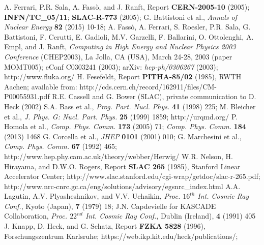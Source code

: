               A. Ferrari, P.R. Sala, A. Fass\`o, and J. Ranft,
              Report {\bf CERN-2005-10} (2005); {\bf INFN/TC\_05/11}; 
              {\bf SLAC-R-773} (2005);
              G. Battistoni et al., 
              {\it Annals of Nuclear Energy} {\bf 82} (2015) 10-18;
              A. Fass\`o, A. Ferrari, S. Roesler, P.R. Sala,
              G. Battistoni, F. Cerutti, E. Gadioli, M.V. Garzelli, 
              F. Ballarini, O. Ottolenghi, A. Empl, and J. Ranft,
              {\it Computing in High Energy and Nuclear Physics 2003 
              Conference} (CHEP2003), La Jolla, CA (USA), March 24-28, 2003
              (paper MOMT005); eConf C0303241 (2003); 
              arXiv: {\it hep-ph/0306267} (2003);
              http://www.fluka.org/
 H. Fesefeldt, Report {\bf PITHA-85/02} (1985), 
              RWTH Aachen; available from: 
              http://cds.cern.ch/record/162911/files/CM-P00055931.pdf
 R.E. Cassell and G. Bower (SLAC), private communication 
              to D. Heck (2002)
 S.A. Bass et al., {\it Prog. Part. Nucl. Phys.} {\bf 41}
              (1998) 225; M. Bleicher et al., {\it J. Phys. G: Nucl.
              Part. Phys.} {\bf 25} (1999) 1859;
              http://urqmd.org/
 P. Homola et al., {\it Comp. Phys. Comm.} {\bf 173}
              (2005) 71; {\it Comp. Phys. Comm.} {\bf 184} (2013) 1468 
G. Corcella et al., {\it JHEP} {\bf 0101} (2001) 010;
              G. Marchesini et al., {\it Comp. Phys. Comm.} {\bf 67} (1992) 465;
              http://www.hep.phy.cam.ac.uk/theory/webber/Herwig/
 W.R. Nelson, H. Hirayama, and D.W.O. Rogers, Report
              {\bf SLAC 265} (1985), Stanford Linear Accelerator Center;
              http://www.slac.stanford.edu/cgi-wrap/getdoc/slac-r-265.pdf;
              http://www.nrc-cnrc.gc.ca/eng/solutions/advisory/egsnrc\_index.html
 A.A. Lagutin, A.V. Plyasheshnikov, and V.V. Uchaikin, 
              {\it Proc. $16^{th}$ Int. Cosmic Ray Conf.}, Kyoto (Japan), 
              {\bf 7} (1979) 18;
              J.N. Capdevielle for KASCADE Collaboration, {\it Proc. $22^{nd}$ 
              Int. Cosmic Ray Conf.}, Dublin (Ireland), {\bf 4} (1991) 405
 J. Knapp, D. Heck, and G. Schatz, Report 
              {\bf FZKA 5828} (1996), Forschungszentrum Karls\-ruhe;
              https://web.ikp.kit.edu/heck/publications/;\\
